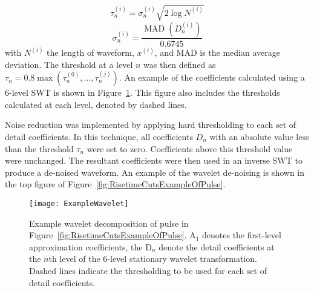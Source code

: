 				\begin{equation}			
					\tau_{n}^{(i)} = \sigma_{n}^{(i)} \sqrt{2 \log N^{(i)}}
				\end{equation}			
				\[
					\sigma_{n}^{(i)} = \frac{\operatorname{MAD}\left(D_{n}^{(i)}\right)}{0.6745}
				\]
with $N^{(i)}$ the length of waveform, $x^{(i)}$, and MAD is the median average deviation.  The threshold at a level $n$ was then defined as $\tau_{n} = 0.8 \max(\tau_{n}^{(0)},...,\tau_{n}^{(j)})$.  An example of the coefficients calculated using a 6-level SWT is shown in Figure~\ref{fig:RisetimeCutsWaveletDecompositionOfPulse}.  This figure also includes the thresholds calculated at each level, denoted by dashed lines.  

Noise reduction was implemented by applying hard thresholding to each set of detail coefficients.  In this technique, all coefficients $D_{n}$ with an absolute value less than the threshold $\tau_{n}$ were set to zero.  Coefficients above this threshold value were unchanged.  The resultant coefficients were then used in an inverse SWT to produce a de-noised waveform.  An example of the wavelet de-noising is shown in the top figure of Figure~\ref{fig:RisetimeCutsExampleOfPulse}.
	
			
				\begin{figure}
					\centering
					\texttt{[image: ExampleWavelet]}
					\caption[Example wavelet decomposition of pulse]
					{Example wavelet decomposition of pulse in Figure~\ref{fig:RisetimeCutsExampleOfPulse}.  
					A$_{1}$ denotes the first-level
					 approximation coefficients, the D$_{n}$ denote the detail coefficients at the $n$th level of the 6-level stationary wavelet 
					 transformation.  Dashed lines indicate the thresholding to be used for each set of detail coefficients.}
					\label{fig:RisetimeCutsWaveletDecompositionOfPulse}
				\end{figure}					


